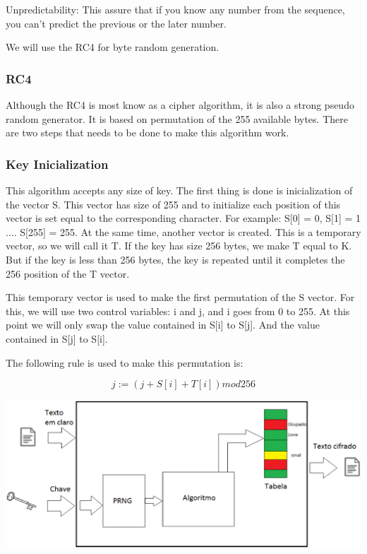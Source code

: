 \documentclass{llncs}
\begin{document}
Unpredictability: This assure that if you know any number from the sequence, you can't predict the previous or the later number. 

We will use the RC4 for byte random generation.

\subsubsection{RC4}

Although the RC4 is most know as a cipher algorithm, it is also a strong pseudo random generator. It is based on permutation of the 255 available bytes. There are two steps that needs to be done to make this algorithm work. 

\subsubsection{Key Inicialization}
This algorithm accepts any size of key. The first thing is done is inicialization of the vector S. This vector has size of 255 and to initialize each position of this vector is set equal to the corresponding character. For example: S[0] = 0, S[1] = 1 .... S[255] = 255. At the same time, another vector is created. This is a temporary vector, so we will call it T. If the key has size 256 bytes, we make T equal to K. But if the key is less than 256 bytes, the key is repeated until it completes the 256 position of the T vector.

This temporary vector is used to make the first permutation of the S vector. For this, we will use two control variables: i and j, and i goes from 0 to 255. At this point we will only swap the value contained in S[i] to S[j]. And the value contained in S[j] to S[i].

The following rule is used to make this permutation is:

\begin{equation}
  j := (j + S[i] + T[i]) mod 256
\end{equation}

\includegraphics{./figuras/funcionamento}
\end{document}
